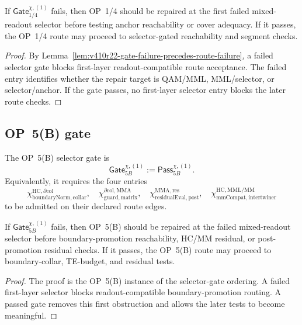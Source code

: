\begin{proposition}
\label{prop:v410r22-op14-gate-consequence}
If \(\mathsf{Gate}_{1/4}^{\chi,(1)}\) fails, then OP~1/4 should be repaired at
the first failed mixed-readout selector before testing anchor reachability or
cover adequacy. If it passes, the OP~1/4 route may proceed to selector-gated
reachability and segment checks.
\end{proposition}

\begin{proof}
By Lemma~\ref{lem:v410r22-gate-failure-precedes-route-failure}, a failed
selector gate blocks first-layer readout-compatible route acceptance. The
failed entry identifies whether the repair target is QAM/MML, MML/selector, or
selector/anchor. If the gate passes, no first-layer selector entry blocks the
later route checks.
\end{proof}

\subsection{OP~5(B) gate}
\label{subsec:v410r22-op5b-gate}

\begin{definition}
\label{def:v410r22-op5b-selector-gate}
The OP~5(B) selector gate is
\[
 \mathsf{Gate}_{5B}^{\chi,(1)}
 :=
 \mathsf{Pass}_{5B}^{\chi,(1)}.
\]
Equivalently, it requires the four entries
\[
 \chi^{\mathrm{HC},\partial\mathrm{col}}_{\mathrm{boundaryNorm},\mathrm{collar}},
 \quad
 \chi^{\partial\mathrm{col},\mathrm{MMA}}_{\mathrm{guard},\mathrm{matrix}},
 \quad
 \chi^{\mathrm{MMA},\mathrm{res}}_{\mathrm{residualEval},\mathrm{post}},
 \quad
 \chi^{\mathrm{HC},\mathrm{MML/MM}}_{\mathrm{mmCompat},\mathrm{intertwiner}}
\]
to be admitted on their declared route edges.
\end{definition}

\begin{proposition}
\label{prop:v410r22-op5b-gate-consequence}
If \(\mathsf{Gate}_{5B}^{\chi,(1)}\) fails, then OP~5(B) should be repaired at
the failed mixed-readout selector before boundary-promotion reachability,
HC/MM residual, or post-promotion residual checks. If it passes, the OP~5(B)
route may proceed to boundary-collar, TE-budget, and residual tests.
\end{proposition}

\begin{proof}
The proof is the OP~5(B) instance of the selector-gate ordering. A failed
first-layer selector blocks readout-compatible boundary-promotion routing. A
passed gate removes this first obstruction and allows the later tests to become
meaningful.
\end{proof}

